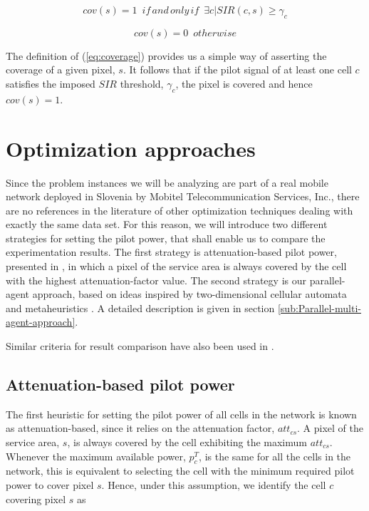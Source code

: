 \begin{equation}
cov(s)=1\,\,\, if\, and\, only\, if\,\,\,\exists c\vert SIR(c,s)\ge\gamma_{c}\label{eq:coverage}
\end{equation}


\[
cov(s)=0\,\,\, otherwise
\]


The definition of (\ref{eq:coverage}) provides us a simple way of
asserting the coverage of a given pixel, $s$. It follows that if
the pilot signal of at least one cell $c$ satisfies the imposed $SIR$
threshold, $\gamma_{c}$, the pixel is covered and hence $cov(s)=1$.


\section{Optimization approaches \label{sec:Solution-approaches}}

Since the problem instances we will be analyzing are part of a real
mobile network deployed in Slovenia by Mobitel Telecommunication Services,
Inc., there are no references in the literature of other optimization
techniques dealing with exactly the same data set. For this reason,
we will introduce two different strategies for setting the pilot power,
that shall enable us to compare the experimentation results. The first
strategy is attenuation-based pilot power, presented in \cite{Siomina_Pilot.power.optimization:2004},
in which a pixel of the service area is always covered by the cell
with the highest attenuation-factor value. The second strategy is
our parallel-agent approach, based on ideas inspired by two-dimensional
cellular automata \cite{Sarkar_Cellular.automata.history:2000} and
metaheuristics \cite{Talbi_Metaheuristics:2009}. A detailed description
is given in section \ref{sub:Parallel-multi-agent-approach}.

Similar criteria for result comparison have also been used in \cite{Siomina:Minimum.pilot.power.for.service.coverage}.


\subsection{Attenuation-based pilot power}

The first heuristic for setting the pilot power of all cells in the
network is known as attenuation-based, since it relies on the attenuation
factor, $att_{cs}$. A pixel of the service area, $s$, is always
covered by the cell exhibiting the maximum $att_{cs}$. Whenever the
maximum available power, $p_{c}^{T}$, is the same for all the cells
in the network, this is equivalent to selecting the cell with the
minimum required pilot power to cover pixel $s$. Hence, under this
assumption, we identify the cell $c$ covering pixel $s$ as

